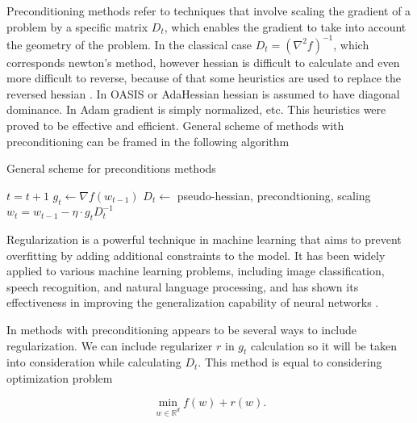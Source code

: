 \documentclass{article}
\begin{document}
Preconditioning methods refer to techniques that involve scaling the gradient of a problem by a specific matrix $D_t$, which enables the gradient to take into account the geometry of the problem. In the classical case $D_t = (\nabla^2 f)^{-1}$, which corresponds newton's method, however hessian is difficult to calculate and even more difficult to reverse, because of that some heuristics are used to replace the reversed hessian \citep{dennis1977quasi}. In OASIS \citep{goldberg2011oasis} or AdaHessian \citep{yao2021adahessian} hessian is assumed to have diagonal dominance. In Adam \citep{kingma2014adam} gradient is simply normalized, etc. This heuristics were proved to be effective and efficient. General scheme of methods with preconditioning can be framed in the following algorithm

\begin{algorithm}[H]
            
            \caption{General scheme for preconditions methods}\label{alg:genalg}
    
            \begin{algorithmic}
            \small{
            
            \State $t = t+1$
            \State $g_t \gets \nabla f(w_{t-1})$
            \State $D_t \gets$ pseudo-hessian, precondtioning, scaling
            \State $w_t = w_{t-1} - \eta \cdot g_t D_t^{-1}$    
            \EndWhile
            }
\end{algorithmic}
\end{algorithm}


Regularization is a powerful technique in machine learning that aims to prevent overfitting by adding additional constraints to the model.
It has been widely applied to various machine learning problems, including image classification, speech recognition, and natural language processing, and has shown its effectiveness in improving the generalization capability of neural networks \citep{poggio1987computational}.

In methods with preconditioning appears to be several ways to include regularization.
We can include regularizer $r$ in $g_t$ calculation so it will be taken into consideration while calculating $D_t$. This method is equal to considering optimization problem 

\begin{equation}
	\min_{w \in \mathbb{R}^d} f(w) + r(w).
\end{equation}
\end{document}
